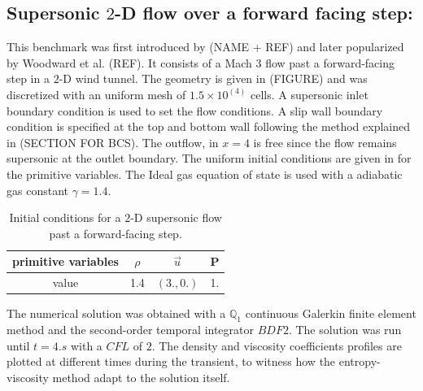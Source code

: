 \subsection{Supersonic $2$-D flow over a forward facing step:} \label{sec:2d-forward-facing-step}
This benchmark was first introduced by (NAME + REF) and later popularized by Woodward et al. (REF). It consists of a Mach 3 flow past a forward-facing step in a $2$-D wind tunnel. The geometry is given in (FIGURE) and was discretized with an uniform mesh of $1.5 \times 10^(4)$ cells. A supersonic inlet boundary condition is used to set the flow conditions. A slip wall boundary condition is specified at the top and bottom wall following the method explained in (SECTION FOR BCS). The outflow, in $x=4$ is free since the flow remains supersonic at the outlet boundary. The uniform initial conditions are given in  for the primitive variables. The Ideal gas equation of state is used with a adiabatic gas constant $\gamma = 1.4$.
\begin{table}[H] 
\caption{\label{tb:ic-forward-facing} Initial conditions for a $2$-D supersonic flow past a forward-facing step.}
\begin{center}
\begin{tabular}{|c|c|c|c|}
\hline
 primitive variables   & $\rho$ & $\vec{u}$ & P \\ \hline
value & 1.4 & $(3.,0.)$ & 1.\\ \hline
\end{tabular}
\end{center}
\nonumber
\end{table}
The numerical solution was obtained with a $\mathbb Q_1$ continuous Galerkin finite element method and the second-order temporal integrator $BDF2$. The solution was run until $t=4.s$ with a $CFL$ of $2$. The density and viscosity coefficients profiles are plotted at different times during the transient, to witness how the entropy-viscosity method adapt to the solution itself.
